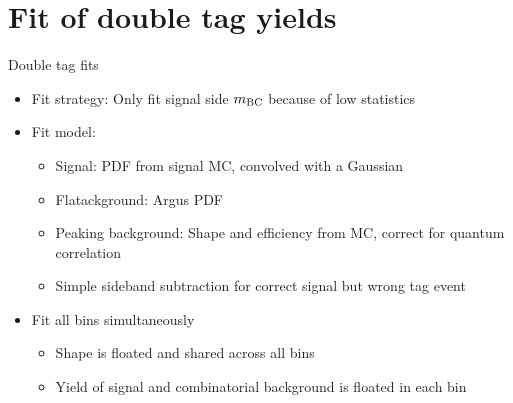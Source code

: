 \documentclass{beamer}
\begin{document}
\section{Fit of double tag yields}
\begin{frame}{Double tag fits}
  \begin{itemize}
    \setlength\itemsep{1.0em}
    \item{Fit strategy: Only fit signal side $m_{\rm BC}$ because of low statistics}
    \item{Fit model:}
    \begin{itemize}
      \item{Signal: PDF from signal MC, convolved with a Gaussian}
      \item{Flatackground: Argus PDF}
      \item{Peaking background: Shape and efficiency from MC, correct for quantum correlation}
      \item{Simple sideband subtraction for correct signal but wrong tag event}
    \end{itemize}
    \item{Fit all bins simultaneously}
    \begin{itemize}
      \item{Shape is floated and shared across all bins}
      \item{Yield of signal and combinatorial background is floated in each bin}
    \end{itemize}
  \end{itemize}
\end{frame}
\end{document}
